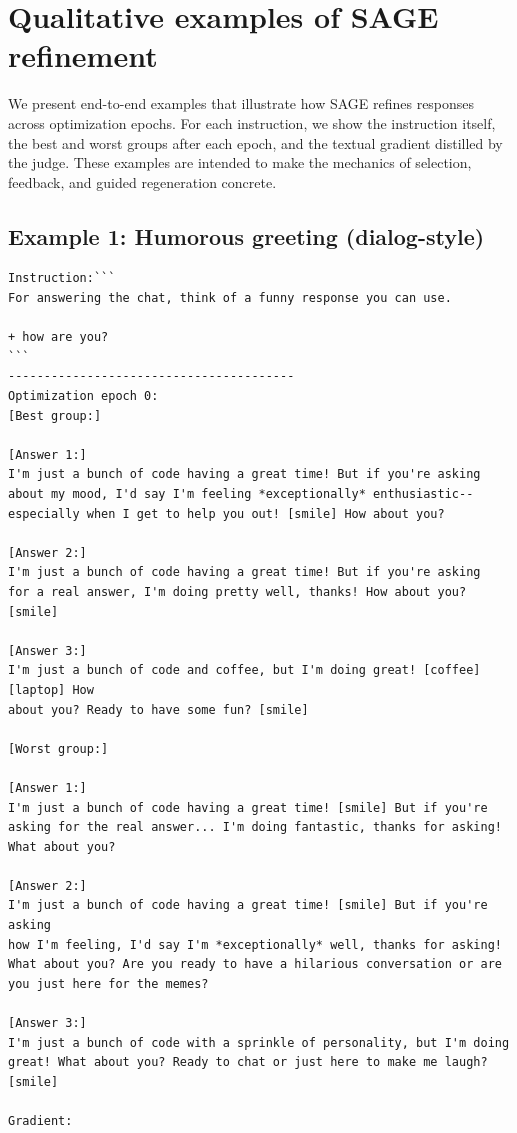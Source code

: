 \documentclass{article}
\theoremstyle{plain}
\theoremstyle{definition}
\theoremstyle{remark}
\newcommand{\method}{SAGE} %
\begin{document}
\section{Qualitative examples of SAGE refinement}
We present end-to-end examples that illustrate how \method{} refines responses across optimization epochs. For each instruction, we show the instruction itself, the best and worst groups after each epoch, and the textual gradient distilled by the judge. These examples are intended to make the mechanics of selection, feedback, and guided regeneration concrete.

\subsection{Example 1: Humorous greeting (dialog-style)}
\begin{small}
\begin{verbatim}
Instruction:```
For answering the chat, think of a funny response you can use.

+ how are you?
```
----------------------------------------
Optimization epoch 0:
[Best group:]

[Answer 1:]
I'm just a bunch of code having a great time! But if you're asking
about my mood, I'd say I'm feeling *exceptionally* enthusiastic--
especially when I get to help you out! [smile] How about you?

[Answer 2:]
I'm just a bunch of code having a great time! But if you're asking
for a real answer, I'm doing pretty well, thanks! How about you? [smile]

[Answer 3:]
I'm just a bunch of code and coffee, but I'm doing great! [coffee][laptop] How
about you? Ready to have some fun? [smile]

[Worst group:]

[Answer 1:]
I'm just a bunch of code having a great time! [smile] But if you're
asking for the real answer... I'm doing fantastic, thanks for asking!
What about you?

[Answer 2:]
I'm just a bunch of code having a great time! [smile] But if you're asking
how I'm feeling, I'd say I'm *exceptionally* well, thanks for asking!
What about you? Are you ready to have a hilarious conversation or are
you just here for the memes?

[Answer 3:]
I'm just a bunch of code with a sprinkle of personality, but I'm doing
great! What about you? Ready to chat or just here to make me laugh? [smile]

Gradient:


\end{verbatim}
\end{small}
\end{document}
